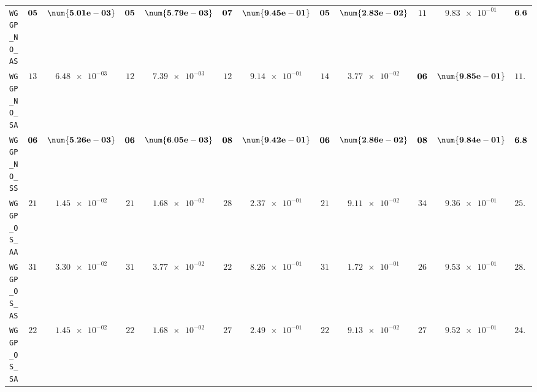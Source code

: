 \begin{xltabular}{\textwidth}{l||cC|cC|cC|cC|cC||c}
	\texttt{WGGP\_NO\_AS} & $\bf 05$ & $\bf \num{5.01e-03}$ & $\bf 05$ & $\bf \num{5.79e-03}$ & $\bf 07$ & $\bf \num{9.45e-01}$ & $\bf 05$ & $\bf \num{2.83e-02}$ & $ 11$ & $ \num{9.83e-01}$ & $\bf 6.6$  \\
	\texttt{WGGP\_NO\_SA} & $ 13$ & $ \num{6.48e-03}$ & $ 12$ & $ \num{7.39e-03}$ & $ 12$ & $ \num{9.14e-01}$ & $ 14$ & $ \num{3.77e-02}$ & $\bf 06$ & $\bf \num{9.85e-01}$ & $ 11.4$  \\
	\texttt{WGGP\_NO\_SS} & $\bf 06$ & $\bf \num{5.26e-03}$ & $\bf 06$ & $\bf \num{6.05e-03}$ & $\bf 08$ & $\bf \num{9.42e-01}$ & $\bf 06$ & $\bf \num{2.86e-02}$ & $\bf 08$ & $\bf \num{9.84e-01}$ & $\bf 6.8$  \\
	\texttt{WGGP\_OS\_AA} & $ 21$ & $ \num{1.45e-02}$ & $ 21$ & $ \num{1.68e-02}$ & $ 28$ & $ \num{2.37e-01}$ & $ 21$ & $ \num{9.11e-02}$ & $ 34$ & $ \num{9.36e-01}$ & $ 25.0$  \\
	\texttt{WGGP\_OS\_AS} & $ 31$ & $ \num{3.30e-02}$ & $ 31$ & $ \num{3.77e-02}$ & $ 22$ & $ \num{8.26e-01}$ & $ 31$ & $ \num{1.72e-01}$ & $ 26$ & $ \num{9.53e-01}$ & $ 28.2$  \\
	\texttt{WGGP\_OS\_SA} & $ 22$ & $ \num{1.45e-02}$ & $ 22$ & $ \num{1.68e-02}$ & $ 27$ & $ \num{2.49e-01}$ & $ 22$ & $ \num{9.13e-02}$ & $ 27$ & $ \num{9.52e-01}$ & $ 24.0$  \\

\end{xltabular}
